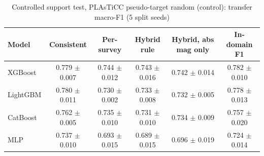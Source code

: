 \begin{table}
\centering
\caption{Controlled support test, PLAsTiCC pseudo-target random (control): transfer macro-F1 (5 split seeds)}
\begin{tabular}{lccccc}
\hline
Model & Consistent & Per-survey & Hybrid rule & Hybrid, abs mag only & In-domain F1 \\
\hline
XGBoost & 0.779 $\pm$ 0.007 & 0.744 $\pm$ 0.012 & 0.743 $\pm$ 0.016 & 0.742 $\pm$ 0.014 & 0.782 $\pm$ 0.010 \\
LightGBM & 0.780 $\pm$ 0.011 & 0.730 $\pm$ 0.002 & 0.733 $\pm$ 0.008 & 0.732 $\pm$ 0.005 & 0.778 $\pm$ 0.013 \\
CatBoost & 0.762 $\pm$ 0.005 & 0.735 $\pm$ 0.010 & 0.731 $\pm$ 0.010 & 0.734 $\pm$ 0.009 & 0.757 $\pm$ 0.020 \\
MLP & 0.737 $\pm$ 0.010 & 0.693 $\pm$ 0.015 & 0.689 $\pm$ 0.015 & 0.696 $\pm$ 0.019 & 0.724 $\pm$ 0.014 \\
\hline
\end{tabular}
\end{table}
